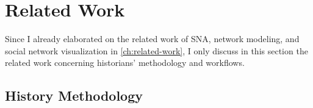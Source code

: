 


\section{Related Work}

Since I already elaborated on the related work of SNA, network modeling, and social network visualization in \autoref{ch:related-work}, I only discuss in this section the related work concerning historians' methodology and workflows.


\subsection{History Methodology}

